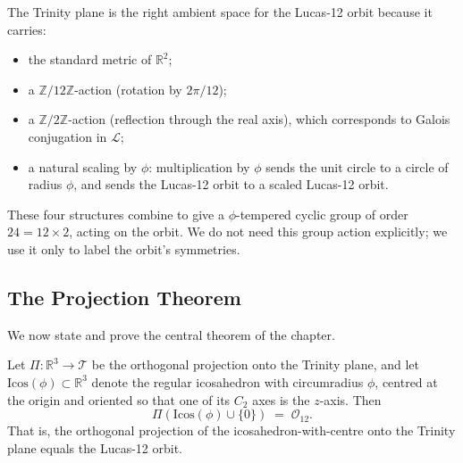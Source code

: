 The Trinity plane is the right ambient space for the Lucas-12 orbit
because it carries:

\begin{itemize}
\item the standard metric of $\mathbb{R}^{2}$;
\item a $\mathbb{Z}/12\mathbb{Z}$-action (rotation by $2\pi / 12$);
\item a $\mathbb{Z}/2\mathbb{Z}$-action (reflection through the
  real axis), which corresponds to Galois conjugation in
  $\mathcal{L}$;
\item a natural scaling by $\phi$: multiplication by $\phi$ sends
  the unit circle to a circle of radius $\phi$, and sends the
  Lucas-12 orbit to a scaled Lucas-12 orbit.
\end{itemize}

These four structures combine to give a $\phi$-tempered cyclic group
of order $24 = 12 \times 2$, acting on the orbit. We do not need
this group action explicitly; we use it only to label the orbit's
symmetries.

\subsection{The Projection Theorem}
\label{fa_13:sec:13-projection}

We now state and prove the central theorem of the chapter.

\begin{theorem}
\label{thm:13-projection}
Let $\Pi : \mathbb{R}^{3} \to \mathcal{T}$ be the orthogonal
projection onto the Trinity plane, and let
$\mathrm{Icos}(\phi) \subset \mathbb{R}^{3}$ denote the regular
icosahedron with circumradius $\phi$, centred at the origin and
oriented so that one of its $C_{2}$ axes is the $z$-axis. Then
\[
  \Pi(\mathrm{Icos}(\phi) \cup \{0\}) \;=\; \mathcal{O}_{12}.
\]
That is, the orthogonal projection of the icosahedron-with-centre
onto the Trinity plane equals the Lucas-12 orbit.
\end{theorem}


